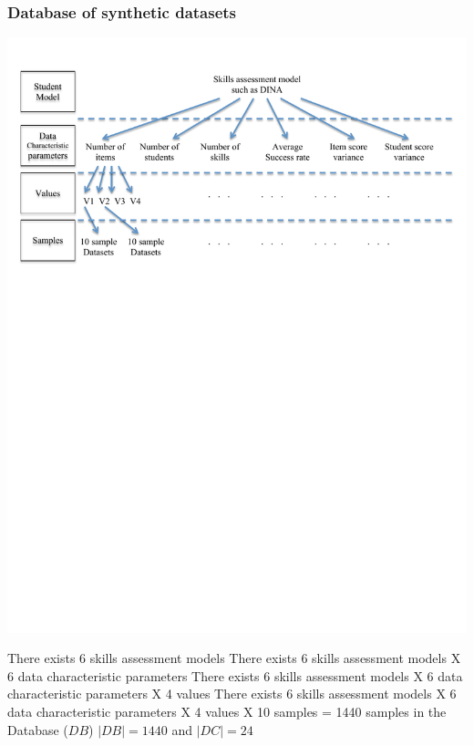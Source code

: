 \documentclass{beamer}
\begin{document}
\begin{frame}\frametitle{Database of synthetic datasets}
\includegraphics[trim=1cm 17cm 1cm 1cm,scale=0.55]{images/Data-Gen-Break-Down.pdf}
\begin{overprint}
 \small There exists 6 skills assessment models 
 \small There exists 6 skills assessment models X 6 data characteristic parameters 
 \small There exists 6 skills assessment models X 6 data characteristic parameters X 4 values 
 \small There exists 6 skills assessment models X 6 data characteristic parameters X 4 values X 10 samples = 1440 samples in the Database ($DB$)
 $|DB| = 1440$ and $|DC| = 24$
\end{overprint}
\end{frame}
\end{document}
